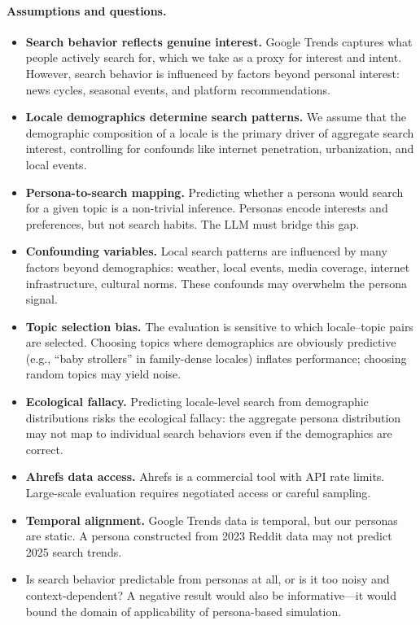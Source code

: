 \paragraph{Assumptions and questions.}
\begin{itemize}
    \item \textbf{Search behavior reflects genuine interest.} Google Trends captures what people actively search for, which we take as a proxy for interest and intent. However, search behavior is influenced by factors beyond personal interest: news cycles, seasonal events, and platform recommendations.
    \item \textbf{Locale demographics determine search patterns.} We assume that the demographic composition of a locale is the primary driver of aggregate search interest, controlling for confounds like internet penetration, urbanization, and local events.
    \item \textbf{Persona-to-search mapping.} Predicting whether a persona would search for a given topic is a non-trivial inference. Personas encode interests and preferences, but not search habits. The LLM must bridge this gap.
    \item \textbf{Confounding variables.} Local search patterns are influenced by many factors beyond demographics: weather, local events, media coverage, internet infrastructure, cultural norms. These confounds may overwhelm the persona signal.
    \item \textbf{Topic selection bias.} The evaluation is sensitive to which locale--topic pairs are selected. Choosing topics where demographics are obviously predictive (e.g., ``baby strollers'' in family-dense locales) inflates performance; choosing random topics may yield noise.
    \item \textbf{Ecological fallacy.} Predicting locale-level search from demographic distributions risks the ecological fallacy: the aggregate persona distribution may not map to individual search behaviors even if the demographics are correct.
    \item \textbf{Ahrefs data access.} Ahrefs is a commercial tool with API rate limits. Large-scale evaluation requires negotiated access or careful sampling.
    \item \textbf{Temporal alignment.} Google Trends data is temporal, but our personas are static. A persona constructed from 2023 Reddit data may not predict 2025 search trends.
    \item Is search behavior predictable from personas at all, or is it too noisy and context-dependent? A negative result would also be informative---it would bound the domain of applicability of persona-based simulation.

\end{itemize}
